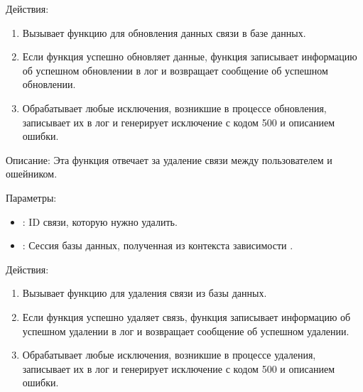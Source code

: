 \documentclass[letterpaper,10pt,russian]{sphinxmanual}
\begin{document}
\sphinxAtStartPar
Действия:
\begin{enumerate}
%
\item {} 
\sphinxAtStartPar
Вызывает функцию  для обновления данных связи в базе данных.

\item {} 
\sphinxAtStartPar
Если функция  успешно обновляет данные, функция записывает информацию об успешном обновлении в лог и возвращает сообщение об успешном обновлении.

\item {} 
\sphinxAtStartPar
Обрабатывает любые исключения, возникшие в процессе обновления, записывает их в лог и генерирует исключение  с кодом 500 и описанием ошибки.

\end{enumerate}

\sphinxAtStartPar
{}

\sphinxAtStartPar
Описание: Эта функция отвечает за удаление связи между пользователем и ошейником.

\sphinxAtStartPar
Параметры:
\begin{itemize}
\item {} 
\sphinxAtStartPar
{}: ID связи, которую нужно удалить.

\item {} 
\sphinxAtStartPar
{}: Сессия базы данных, полученная из контекста зависимости .

\end{itemize}

\sphinxAtStartPar
Действия:
\begin{enumerate}
%
\item {} 
\sphinxAtStartPar
Вызывает функцию  для удаления связи из базы данных.

\item {} 
\sphinxAtStartPar
Если функция  успешно удаляет связь, функция записывает информацию об успешном удалении в лог и возвращает сообщение об успешном удалении.

\item {} 
\sphinxAtStartPar
Обрабатывает любые исключения, возникшие в процессе удаления, записывает их в лог и генерирует исключение  с кодом 500 и описанием ошибки.

\end{enumerate}
\end{document}

